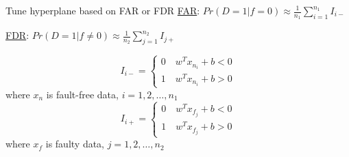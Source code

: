 \documentclass[10pt]{beamer}
\begin{document}
\begin{frame}{Tune hyperplane based on FAR or FDR}
\href{https://ieeexplore.ieee.org/abstract/document/8306878}{FAR}: $Pr(D=1|f=0) \approx \frac{1}{n_1}\sum_{i=1}^{n_1}I_{i-}$  \par
\href{https://ieeexplore.ieee.org/abstract/document/8306878}{FDR}: $Pr(D=1|f \neq 0) \approx          \frac{1}{n_2}\sum_{j=1}^{n_2}I_{j+}$ \par
\begin{equation}
I_{i-} = \left\{ \begin{aligned}
0 \quad  w^Tx_{n_i} + b < 0 \\
1 \quad w^Tx_{n_i} +b  > 0 
\end{aligned}
\right.
\end{equation}
where $x_n$ is fault-free data, $i=1,2,\dots,n_1$
\begin{equation}
I_{i+} = \left\{ \begin{aligned}
0 \quad  w^Tx_{f_j} + b < 0 \\
1 \quad w^Tx_{f_j} +b  > 0 
\end{aligned}
\right.
\end{equation}
where $x_f$ is faulty data, $j=1,2,\dots,n_2$
\end{frame}
\end{document}

